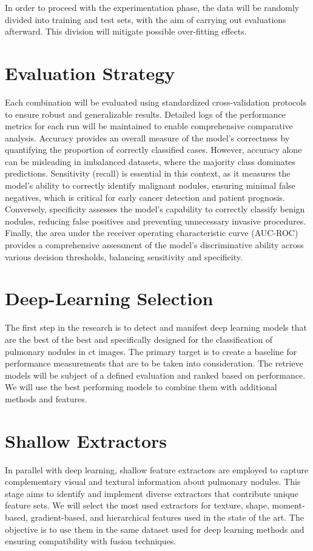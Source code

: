     In order to proceed with the experimentation phase, the data will be randomly divided into training and test sets, with the aim of carrying out evaluations afterward. This division will mitigate possible over-fitting effects.
        
\section{Evaluation Strategy}
Each combination will be evaluated using standardized cross-validation protocols to ensure robust and generalizable results. Detailed logs of the performance metrics for each run will be maintained to enable comprehensive comparative analysis.
Accuracy provides an overall measure of the model’s correctness by quantifying the proportion of correctly classified cases. However, accuracy alone can be misleading in imbalanced datasets, where the majority class dominates predictions. Sensitivity (recall) is essential in this context, as it measures the model's ability to correctly identify malignant nodules, ensuring minimal false negatives, which is critical for early cancer detection and patient prognosis. Conversely, specificity assesses the model’s capability to correctly classify benign nodules, reducing false positives and preventing unnecessary invasive procedures. Finally, the area under the receiver operating characteristic curve (AUC-ROC) provides a comprehensive assessment of the model's discriminative ability across various decision thresholds, balancing sensitivity and specificity.

\section{Deep-Learning Selection}
The first step in the research is to detect and manifest deep learning models that are the best of the best and specifically designed for the classification of pulmonary nodules in \ac{ct} images. The primary target is to create a baseline for performance measurements that are to be taken into consideration. The retrieve models will be subject of a defined evaluation and ranked based on performance. We will use the best performing models to combine them with additional methods and features. 

\section{Shallow Extractors}
In parallel with deep learning, shallow feature extractors are employed to capture complementary visual and textural information about pulmonary nodules. This stage aims to identify and implement diverse extractors that contribute unique feature sets. We will select the most used extractors for texture, shape, moment-based, gradient-based, and hierarchical features used in the state of the art.
The objective is to use them in the same dataset used for deep learning methods and ensuring compatibility with fusion techniques.

